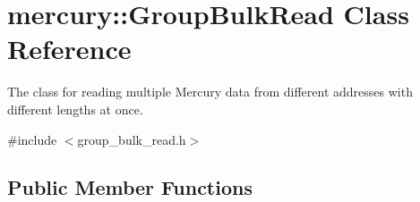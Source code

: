 \hypertarget{classmercury_1_1_group_bulk_read}{}\section{mercury\+:\+:Group\+Bulk\+Read Class Reference}
\label{classmercury_1_1_group_bulk_read}


The class for reading multiple Mercury data from different addresses with different lengths at once.  




{\ttfamily \#include $<$group\+\_\+bulk\+\_\+read.\+h$>$}

\subsection*{Public Member Functions}
